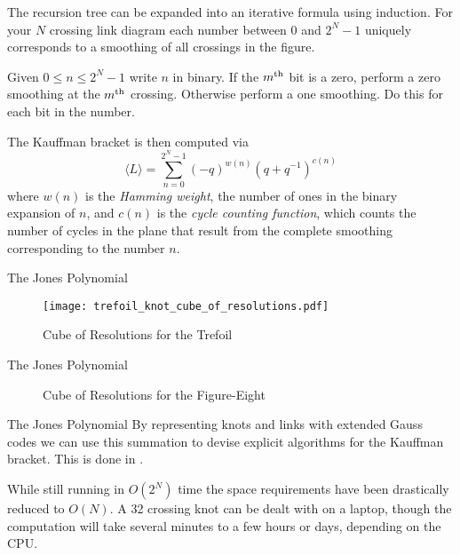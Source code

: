 \documentclass{beamer}
\begin{document}
    \begin{frame}
        The recursion tree can be expanded into an iterative formula using
        induction. For your $N$ crossing link diagram each number between 0 and
        $2^{N}-1$ uniquely corresponds to a smoothing of all crossings in the
        figure.
        \par\hfill\par
        Given $0\leq{n}\leq{2}^{N}-1$ write $n$ in binary. If the
        $m^{\small\textrm{th}}$ bit is a zero, perform a zero smoothing at
        the $m^{\small\textrm{th}}$ crossing. Otherwise perform a one
        smoothing. Do this for each bit in the number.
    \end{frame}
    \begin{frame}
        The Kauffman bracket is then computed via
        \begin{equation}
            \langle{L}\rangle
            =\sum_{n=0}^{2^{N}-1}(-q)^{w(n)}(q+q^{-1})^{c(n)}
        \end{equation}
        where $w(n)$ is the \textit{Hamming weight}, the number of ones in the
        binary expansion of $n$, and $c(n)$ is the
        \textit{cycle counting function}, which counts the number of cycles
        in the plane that result from the complete smoothing corresponding to
        the number $n$.
    \end{frame}
    \begin{frame}{The Jones Polynomial}
        \begin{figure}
            \centering
            \texttt{[image: trefoil\_knot\_cube\_of\_resolutions.pdf]}
            \caption{Cube of Resolutions for the Trefoil}
        \end{figure}
    \end{frame}
    \begin{frame}{The Jones Polynomial}
        \begin{figure}
            \centering
            \caption{Cube of Resolutions for the Figure-Eight}
        \end{figure}
    \end{frame}
    \begin{frame}{The Jones Polynomial}
        By representing knots and links with extended Gauss codes we can
        use this summation to devise explicit algorithms for the Kauffman
        bracket. This is done in \cite{MaguireJones}.
        \par\hfill\par
        While still running in
        $O(2^{N})$ time the space requirements have been drastically reduced
        to $O(N)$. A 32 crossing knot can be dealt with on a laptop, though
        the computation will take several minutes to a few hours or days,
        depending on the CPU.
    \end{frame}
\end{document}
